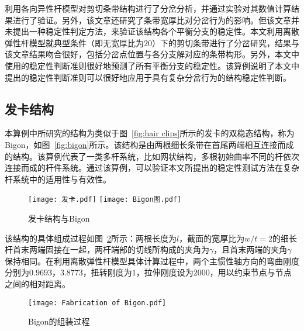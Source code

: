 \citet{yu2019bifurcations}利用各向异性杆模型对剪切条带结构进行了分岔分析，并通过实验对其数值计算结果进行了验证。另外，该文章还研究了条带宽厚比对分岔行为的影响。但该文章并未提出一种稳定性判定方法，来验证该结构各个平衡分支的稳定性。本文利用离散弹性杆模型就典型条件（即无宽厚比为$20$）下的剪切条带进行了分岔研究，结果与该文章结果\cite{yu2019bifurcations}吻合很好，包括分岔点位置与各分支解对应的条带构形。另外，本文中使用的稳定性判断准则很好地预测了所有平衡分支的稳定性。该算例说明了本文中提出的稳定性判断准则可以很好地应用于具有复杂分岔行为的结构稳定性判断。
\subsection{发卡结构}
本算例中所研究的结构为类似于图~\ref{fig:hair clips}所示的发卡的双稳态结构，称为Bigon，如图~\ref{fig:bigon}所示。该结构是由两根细长条带在首尾两端相互连接而成的结构。该算例代表了一类多杆系统，比如网状结构\cite{huang2022buckling}，多根初始曲率不同的杆依次连接而成的杆件系统\cite{shi2025double}。通过该算例，可以验证本文所提出的稳定性测试方法在复杂杆系统中的适用性与有效性。
\begin{figure}
	\centering
	{\texttt{[image: 发卡.pdf]}}
	{\texttt{[image: Bigon图.pdf]}}
	\caption{发卡结构与Bigon}
	\label{fig:bigon构形}
\end{figure}

该结构的具体组成过程如图~\ref{fig:Fabrication of Bigon}所示：两根长度为$l$，截面的宽厚比为$w/t=2$的细长杆首末两端固接在一起，两杆端部的切线所构成的夹角为$\gamma$，且首末两端的夹角$\gamma$保持相同。在利用离散弹性杆模型具体计算过程中，两个主惯性轴方向的弯曲刚度分别为$0.9693$，$3.8773$，扭转刚度为$1$，拉伸刚度设为$2000$，用以约束节点与节点之间的相对距离。
\begin{figure}
	\centering
	\texttt{[image: Fabrication of Bigon.pdf]}
	\caption{Bigon的组装过程\cite{yu2021numerical}}
	\label{fig:Fabrication of Bigon}
\end{figure}

